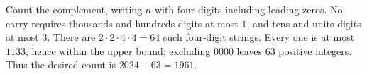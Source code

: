 Count the complement, writing $n$ with four digits including leading zeros. No carry requires thousands and hundreds digits at most $1$, and tens and units digits at most $3$. There are $2\cdot2\cdot4\cdot4=64$ such four-digit strings. Every one is at most $1133$, hence within the upper bound; excluding $0000$ leaves $63$ positive integers. Thus the desired count is $2024-63=\boxed{1961}$.
